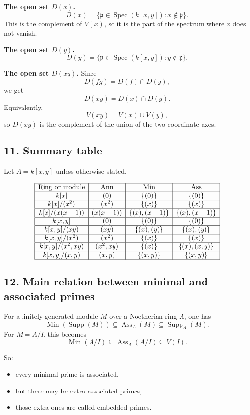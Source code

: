 \documentclass[12pt,a4paper]{article}
\theoremstyle{notespace}
\DeclareMathOperator{\Spec}{Spec}
\DeclareMathOperator{\Ass}{Ass}
\DeclareMathOperator{\Ann}{Ann}
\DeclareMathOperator{\Supp}{Supp}
\DeclareMathOperator{\Min}{Min}
\begin{document}
\textbf{The open set \(D(x)\).}
\[
D(x)=\{\mathfrak p\in \Spec(k[x,y]):x\notin \mathfrak p\}.
\]
This is the complement of \(V(x)\), so it is the part of the spectrum where \(x\) does not vanish.

\textbf{The open set \(D(y)\).}
\[
D(y)=\{\mathfrak p\in \Spec(k[x,y]):y\notin \mathfrak p\}.
\]

\textbf{The open set \(D(xy)\).}
Since
\[
D(fg)=D(f)\cap D(g),
\]
we get
\[
D(xy)=D(x)\cap D(y).
\]
Equivalently,
\[
V(xy)=V(x)\cup V(y),
\]
so \(D(xy)\) is the complement of the union of the two coordinate axes.

\subsection*{11. Summary table}

Let \(A=k[x,y]\) unless otherwise stated.

\[
\begin{array}{|c|c|c|c|}
	\hline
	\text{Ring or module} & \Ann & \Min & \Ass \\
	\hline
	k[x] & (0) & \{(0)\} & \{(0)\} \\
	\hline
	k[x]/(x^2) & (x^2) & \{(x)\} & \{(x)\} \\
	\hline
	k[x]/(x(x-1)) & (x(x-1)) & \{(x),(x-1)\} & \{(x),(x-1)\} \\
	\hline
	k[x,y] & (0) & \{(0)\} & \{(0)\} \\
	\hline
	k[x,y]/(xy) & (xy) & \{(x),(y)\} & \{(x),(y)\} \\
	\hline
	k[x,y]/(x^2) & (x^2) & \{(x)\} & \{(x)\} \\
	\hline
	k[x,y]/(x^2,xy) & (x^2,xy) & \{(x)\} & \{(x),(x,y)\} \\
	\hline
	k[x,y]/(x,y) & (x,y) & \{(x,y)\} & \{(x,y)\} \\
	\hline
\end{array}
\]

\subsection*{12. Main relation between minimal and associated primes}

For a finitely generated module \(M\) over a Noetherian ring \(A\), one has
\[
\Min(\Supp(M))\subseteq \Ass_A(M)\subseteq \Supp_A(M).
\]
For \(M=A/I\), this becomes
\[
\Min(A/I)\subseteq \Ass_A(A/I)\subseteq V(I).
\]

So:
\begin{itemize}
	\item every minimal prime is associated,
	\item but there may be extra associated primes,
	\item those extra ones are called embedded primes.
\end{itemize}
\end{document}
